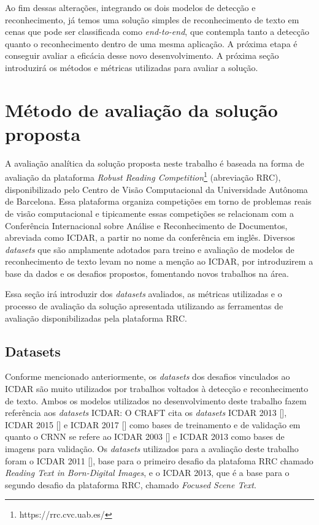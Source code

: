 Ao fim dessas alterações, integrando os dois modelos de detecção e reconhecimento, já temos uma solução simples de reconhecimento de texto em cenas que pode ser classificada como \textit{end-to-end}, que contempla tanto a detecção quanto o reconhecimento dentro de uma mesma aplicação. A próxima etapa é conseguir avaliar a eficácia desse novo desenvolvimento. A próxima seção introduzirá os métodos e métricas utilizadas para avaliar a solução.

\section{Método de avaliação da solução proposta}\label{sec:methodology_validation}

A avaliação analítica da solução proposta neste trabalho é baseada na forma de avaliação da plataforma \textit{Robust Reading Competition}\footnote{https://rrc.cvc.uab.es/} (abreviação RRC), disponibilizado pelo Centro de Visão Computacional da Universidade Autônoma de Barcelona. Essa plataforma organiza competições em torno de problemas reais de visão computacional e tipicamente essas competições se relacionam com a Conferência Internacional sobre Análise e Reconhecimento de Documentos, abreviada como ICDAR, a partir no nome da conferência em inglês. Diversos \textit{datasets} que são amplamente adotados para treino e avaliação de modelos de reconhecimento de texto levam no nome a menção ao ICDAR, por introduzirem a base da dados e os desafios propostos, fomentando novos trabalhos na área.

Essa seção irá introduzir dos \textit{datasets} avaliados, as métricas utilizadas e o processo de avaliação da solução apresentada utilizando as ferramentas de avaliação disponibilizadas pela plataforma RRC.

\subsection{Datasets}\label{sec:methodology_datasets}

Conforme mencionado anteriormente, os \textit{datasets} dos desafios vinculados ao ICDAR são muito utilizados por trabalhos voltados à detecção e reconhecimento de texto. Ambos os modelos utilizados no desenvolvimento deste trabalho fazem referência aos \textit{datasets} ICDAR: O CRAFT cita os \textit{datasets} ICDAR 2013 [], ICDAR 2015 [] e ICDAR 2017 [] como bases de treinamento e de validação em quanto o CRNN se refere ao ICDAR 2003 [] e ICDAR 2013 como bases de imagens para validação. Os \textit{datasets} utilizados para a avaliação deste trabalho foram o ICDAR 2011 [], base para o primeiro desafio da platafoma RRC chamado \textit{Reading Text in Born-Digital Images}, e o ICDAR 2013, que é a base para o segundo desafio da plataforma RRC, chamado \textit{Focused Scene Text}.

